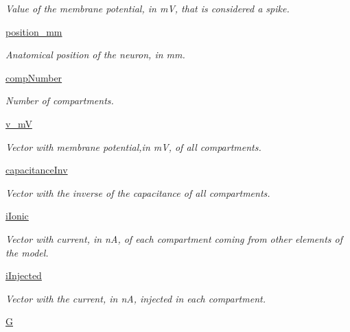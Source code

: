 \begin{DoxyCompactItemize}
\begin{DoxyCompactList}\small\item\em Value of the membrane potential, in mV, that is considered a spike. \end{DoxyCompactList}\item 
\hyperlink{class_interneuron_1_1_interneuron_a3cc482741f09e4230c9e0365de494433}{position\+\_\+mm}
\begin{DoxyCompactList}\small\item\em Anatomical position of the neuron, in mm. \end{DoxyCompactList}\item 
\hyperlink{class_interneuron_1_1_interneuron_a932bf948613265453822e7dd6fdac4a8}{comp\+Number}
\begin{DoxyCompactList}\small\item\em Number of compartments. \end{DoxyCompactList}\item 
\hyperlink{class_interneuron_1_1_interneuron_a55cb57e83adad5560b6e6134ad868219}{v\+\_\+mV}
\begin{DoxyCompactList}\small\item\em Vector with membrane potential,in mV, of all compartments. \end{DoxyCompactList}\item 
\hyperlink{class_interneuron_1_1_interneuron_a6c5e0b83da3c1a4323699b81034692c9}{capacitance\+Inv}
\begin{DoxyCompactList}\small\item\em Vector with the inverse of the capacitance of all compartments. \end{DoxyCompactList}\item 
\hyperlink{class_interneuron_1_1_interneuron_a3fb131eadbe0e3f7efecfb2fdc5a707b}{i\+Ionic}
\begin{DoxyCompactList}\small\item\em Vector with current, in nA, of each compartment coming from other elements of the model. \end{DoxyCompactList}\item 
\hyperlink{class_interneuron_1_1_interneuron_ab9a0874ea1e099b07a66ed9eaf3ff14b}{i\+Injected}
\begin{DoxyCompactList}\small\item\em Vector with the current, in nA, injected in each compartment. \end{DoxyCompactList}\item 
\hyperlink{class_interneuron_1_1_interneuron_a1c2c1b2f13cd69c09923e684a0b54171}{G}

\end{DoxyCompactItemize}
